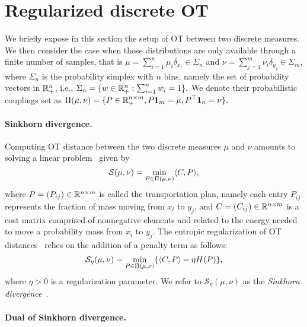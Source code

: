 
\section{Regularized discrete OT} %
\label{sec:regularized_discrete_ot}

We briefly expose in this section the setup of OT between two discrete measures. We then consider the case when those distributions are only available through a finite number of samples, that is $\mu = \sum_{i=1}^n \mu_i \delta_{x_i} \in \Sigma_n$ and $\nu = \sum_{j=1}^m \nu_i \delta_{y_j} \in \Sigma_m$, where $\Sigma_n$ is the probability simplex with $n$ bins, namely the set of probability vectors in ${\mathbb{R}}_+^n$, i.e., $\Sigma_n = \{w \in {\mathbb{R}}_+^n: \sum_{i=1}^n w_i = 1\}.$
We denote their probabilistic couplings set as $\Pi(\mu, \nu) = \{P \in {\mathbb{R}}_+^{n\times m}, P\mathbf{1}_m = \mu, P^\top \mathbf{1}_n = \nu\}.$ 
\paragraph{Sinkhorn divergence.}

Computing OT distance between the two discrete measures $\mu$ and $\nu$  amounts to solving a linear problem~\citep{kantorovich1942} given by
\begin{equation*}
  \label{monge-kantorovich}
  \mathcal{S}(\mu, \nu) =  \min_{P\in \Pi(\mu, \nu)} \langle C, P \rangle,
\end{equation*}
where $P= (P_{ij}) \in {\mathbb{R}}^{n\times m}$ is called the transportation plan, namely each entry $P_{ij}$ represents the fraction of mass moving from $x_i$ to $y_j$, and $C= (C_{ij}) \in {\mathbb{R}}^{n\times m}$ is a cost matrix comprised of nonnegative elements and related to the energy needed to move a probability mass from $x_i$ to $y_j$. 
The entropic regularization of OT distances~\citep{cuturinips13} relies on the addition of a penalty term as follows:
\begin{equation}
\label{sinkhorn-primal}
  \mathcal{S}_\eta(\mu, \nu) =  \min_{P\in \Pi(\mu, \nu)} \{\langle C, P \rangle - \eta H(P)\},
\end{equation}
where $\eta > 0$ is a regularization parameter. We refer to $\mathcal{S}_\eta(\mu, \nu) $ as the \emph{Sinkhorn divergence}~\citep{cuturinips13}.

\paragraph{Dual of Sinkhorn divergence.}

